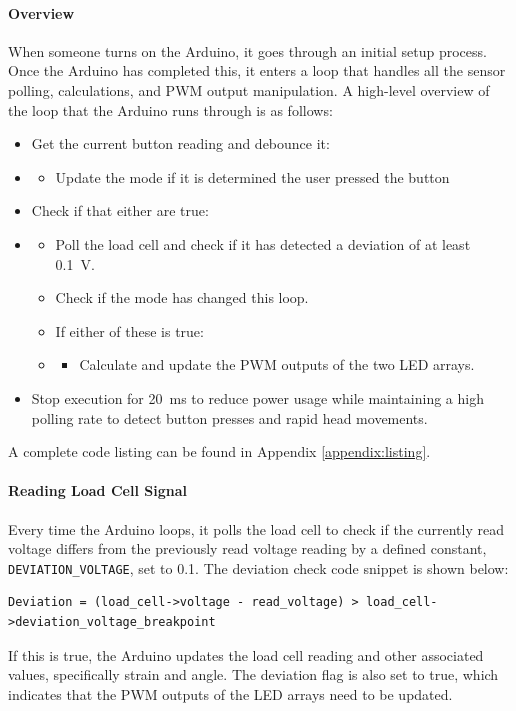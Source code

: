 \documentclass[twoside]{article}
\begin{document}
            \paragraph{Overview}
            When someone turns on the Arduino, it goes through an initial setup process. Once the Arduino has completed this, it enters a loop that handles all the sensor polling, calculations, and PWM output manipulation.
            A high-level overview of the loop that the Arduino runs through is as follows:
            \begin{itemize}
                \item Get the current button reading and debounce it: 
                \item \begin{itemize}
                        \item Update the mode if it is determined the user pressed the button
                    \end{itemize}
                \item Check if that either are true:
                \item \begin{itemize}
                        \item Poll the load cell and check if it has detected a deviation of at least \SI{0.1}{\volt}. 
                        \item Check if the mode has changed this loop. 
                        \item If either of these is true:
                        \item \begin{itemize}
                            \item Calculate and update the PWM outputs of the two LED arrays.
                        \end{itemize}
                    \end{itemize}
                \item Stop execution for \SI{20}{\milli\second} to reduce power usage while maintaining a high polling rate to detect button presses and rapid head movements.
            \end{itemize}
            A complete code listing can be found in Appendix \ref{appendix:listing}.
            \paragraph{Reading Load Cell Signal}
            Every time the Arduino loops, it polls the load cell to check if the currently read voltage differs from the previously read voltage reading by a defined constant, \texttt{DEVIATION\_VOLTAGE}, set to 0.1. The deviation check code snippet is shown below:
            \begin{lstlisting}
Deviation = (load_cell->voltage - read_voltage) > load_cell->deviation_voltage_breakpoint 
            \end{lstlisting}
            If this is true, the Arduino updates the load cell reading and other associated values, specifically strain and angle. The deviation flag is also set to true, which indicates that the PWM outputs of the LED arrays need to be updated.
\end{document}
